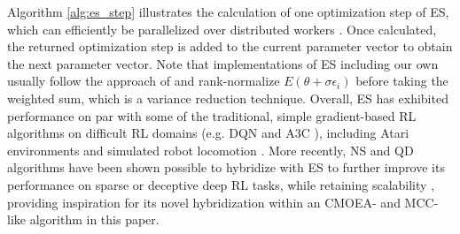 \documentclass{article}
\newcommand{\todo}[1]{\comments{\textcolor{red}{[TODO: #1]}}}
\newcommand{\jc}[1]{\comments{\textcolor{deepForestGreen}{[JC: #1]}}}
\newcommand{\ks}[1]{\comments{\textcolor{purple}{[Ken: #1]}}}
\newcommand{\rw}[1]{\comments{\textcolor{blue}{[Rui: #1]}}}
\newcommand{\comments}[1]{#1}
\begin{document}
Algorithm \ref{alg:es_step} illustrates the calculation of one optimization step of ES, which can efficiently be parallelized over distributed workers \cite{es}.
Once calculated, the returned optimization step is added to the current parameter vector to obtain the next parameter vector. Note that implementations of ES including our own usually follow the approach of \citet{es} and rank-normalize $E(\theta + \sigma\epsilon_{i})$ before taking the weighted sum, which is a variance reduction technique.
Overall, ES has exhibited performance on par with some of the traditional, simple gradient-based RL algorithms on difficult RL domains (e.g. DQN \cite{mnih2015} and A3C \cite{a3c}), 
including Atari environments and simulated robot locomotion \cite{es, conti:nses_nips2018}.
More recently, NS and QD algorithms have been shown possible to hybridize with ES to further improve its performance on sparse or deceptive deep RL tasks, while retaining scalability \cite{conti:nses_nips2018}, 
providing inspiration for its novel hybridization within an CMOEA- and MCC-like algorithm in this paper.
\end{document}

